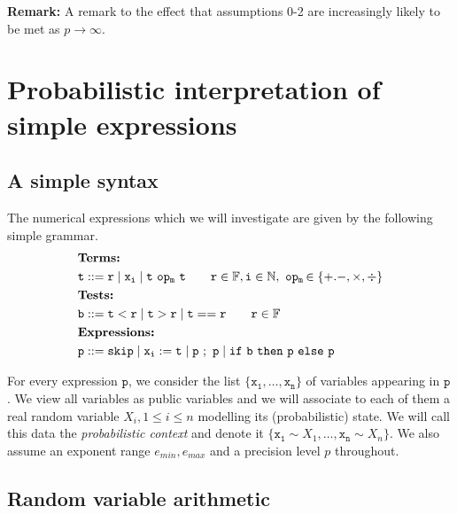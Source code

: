 \documentclass[10pt,conference]{IEEEtran}
\newcommand{\F}{\mathbb{F}}
\newcommand{\N}{\mathbb{N}}
\newcommand{\mop}{~\mathtt{op_m}~}
\begin{document}
\textbf{Remark:}
A remark to the effect that assumptions 0-2 are increasingly likely to be met as $p\to\infty$.



\section{Probabilistic interpretation of simple expressions}

\subsection{A simple syntax}

The numerical expressions which we will investigate are given by the following simple grammar.
\begin{align*}
&\textbf{Terms: }  
\\
& \tt t::= r \mid x_i \mid t\mop t \qquad \mathtt{r}\in\F, \mathtt{i}\in\N, \mop\hspace{-1ex}\in\{+.-,\times,\div\}
\\
&\textbf{Tests: } 
\\
& \tt b::= t < r \mid t > r \mid t == r  \qquad \mathtt{r}\in\F
\\
&\textbf{Expressions:}
\\ 
&\tt p::= skip \mid \mathtt{x_i:=t}\mid \mathtt{p~;~p} \mid if~b~then~p~else~p
\end{align*}

For every expression $\mathtt{p}$, we consider the list $\{\mathtt{x_1,\ldots,x_n}\}$ of variables appearing in $\mathtt{p}$. We view all variables as public variables and we will associate to each of them a real random variable $X_i, 1\leq i\leq n$ modelling its (probabilistic) state. We will call this data the \emph{probabilistic context} and denote it $\{\mathtt{x_1}\sim X_1,\ldots,\mathtt{x_n}\sim X_n\}$.  We also assume an exponent range $e_{min}, e_{max}$ and a precision level $p$ throughout.

\subsection{Random variable arithmetic}
\end{document}
